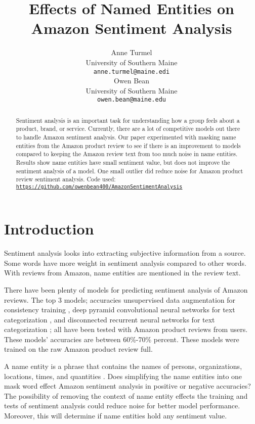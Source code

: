 \documentclass[11pt,a4paper]{article}
\title{Effects of Named Entities on Amazon Sentiment Analysis}
\author{Anne Turmel \\
  University of Southern Maine \\
  \texttt{anne.turmel@maine.edi} \\\And
  Owen Bean \\
  University of Southern Maine \\
  \texttt{owen.bean@maine.edu} \\}
\begin{document}
\maketitle
\begin{abstract}
Sentiment analysis is an important task for understanding how a group feels about a product, brand, or service. Currently, there are a lot of competitive models out there to handle Amazon sentiment analysis. Our paper experimented with masking name entities from the Amazon product review to see if there is an improvement to models compared to keeping the Amazon review text from too much noise in name entities. Results show name entities have small sentiment value, but does not improve the sentiment analysis of a model. One small outlier did reduce noise for Amazon product review sentiment analysis. Code used: \href{https://github.com/owenbean400/AmazonSentimentAnalysis}{\nolinkurl{https://github.com/owenbean400/AmazonSentimentAnalysis}}

\end{abstract}

\section{Introduction}

Sentiment analysis looks into extracting subjective information from a source. Some words have more weight in sentiment analysis compared to other words. With reviews from Amazon, name entities are mentioned in the review text.

There have been plenty of models for predicting sentiment analysis of Amazon reviews. The top 3 models; accuracies unsupervised data augmentation for consistency training \cite{unsupervised}, deep pyramid convolutional neural networks for text categorization \cite{pyramid}, and disconnected recurrent neural networks for text categorization \cite{disconnect}; all have been tested with Amazon product reviews from users. These models' accuracies are between 60\%-70\% percent. These models were trained on the raw Amazon product review full.

A name entity is a phrase that contains the names of persons, organizations, locations, times, and quantities \cite{conll}. Does simplifying the name entities into one mask word effect Amazon sentiment analysis in positive or negative accuracies? The possibility of removing the context of name entity effects the training and tests of sentiment analysis could reduce noise for better model performance. Moreover, this will determine if name entities hold any sentiment value.
\end{document}
